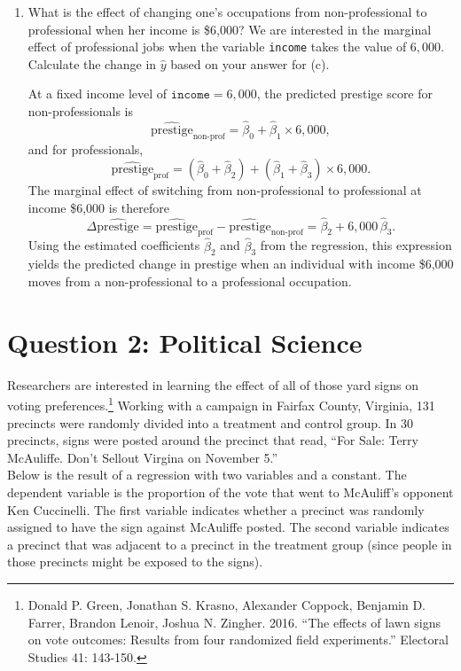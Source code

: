 \documentclass[12pt,letterpaper]{article}
\begin{document}
\begin{enumerate}
	\item [(g)]
	What is the effect of changing one's occupations from non-professional to professional when her income is \$6,000? We are interested in the marginal effect of professional jobs when the variable \texttt{income} takes the value of $6,000$. Calculate the change in $\hat{y}$ based on your answer for (c).
	
	\noindent   At a fixed income level of $\texttt{income} = 6{,}000$, the predicted prestige score for non-professionals is
	\[
	\widehat{\text{prestige}}_{\text{non-prof}} 
	= \hat{\beta}_0 + \hat{\beta}_1 \times 6{,}000,
	\]
	and for professionals,
	\[
	\widehat{\text{prestige}}_{\text{prof}} 
	= (\hat{\beta}_0 + \hat{\beta}_2) + (\hat{\beta}_1 + \hat{\beta}_3)\times 6{,}000.
	\]
	The marginal effect of switching from non-professional to professional at income \$6,000 is therefore
	\[
	\Delta \widehat{\text{prestige}}
	= \widehat{\text{prestige}}_{\text{prof}} - \widehat{\text{prestige}}_{\text{non-prof}}
	= \hat{\beta}_2 + 6{,}000\,\hat{\beta}_3.
	\]
	Using the estimated coefficients $\hat{\beta}_2$ and $\hat{\beta}_3$ from the regression, this expression yields the predicted change in prestige when an individual with income \$6,000 moves from a non-professional to a professional occupation.
	
\end{enumerate}

\newpage

\section*{Question 2: Political Science}
\vspace{.25cm}
\noindent 	Researchers are interested in learning the effect of all of those yard signs on voting preferences.\footnote{Donald P. Green, Jonathan	S. Krasno, Alexander Coppock, Benjamin D. Farrer,	Brandon Lenoir, Joshua N. Zingher. 2016. ``The effects of lawn signs on vote outcomes: Results from four randomized field experiments.'' Electoral Studies 41: 143-150. } Working with a campaign in Fairfax County, Virginia, 131 precincts were randomly divided into a treatment and control group. In 30 precincts, signs were posted around the precinct that read, ``For Sale: Terry McAuliffe. Don't Sellout Virgina on November 5.'' \\

Below is the result of a regression with two variables and a constant.  The dependent variable is the proportion of the vote that went to McAuliff's opponent Ken Cuccinelli. The first variable indicates whether a precinct was randomly assigned to have the sign against McAuliffe posted. The second variable indicates
a precinct that was adjacent to a precinct in the treatment group (since people in those precincts might be exposed to the signs).  \\
\end{document}
